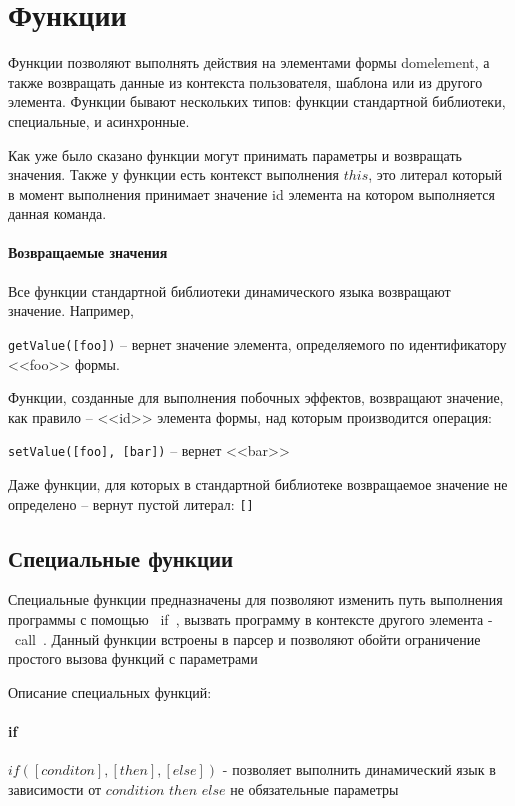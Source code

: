\documentclass[../index.tex]{subfiles}
\begin{document}
\label{sec:functions}
\section{Функции}

Функции позволяют выполнять действия на элементами формы \gls{domelement}, а также 
возвращать данные из контекста пользователя, шаблона или из другого элемента. 
Функции бывают нескольких типов: функции стандартной библиотеки, специальные, и асинхронные.

Как уже было сказано функции могут принимать параметры и возвращать значения. 
Также у функции есть контекст выполнения $this$, это литерал который в момент выполнения принимает значение id 
элемента на котором выполняется данная команда.

\paragraph{Возвращаемые значения}

Все функции стандартной библиотеки динамического языка возвращают значение. Например,

\verb|getValue([foo])| -- вернет значение элемента, определяемого по идентификатору <<foo>> формы.

Функции, созданные для выполнения побочных эффектов, возвращают значение, как правило -- <<id>> элемента формы, над которым производится операция:

\verb|setValue([foo], [bar])| -- вернет <<bar>>

Даже функции, для которых в стандартной библиотеке возвращаемое значение не определено -- вернут пустой литерал: \verb|[]|

\subsection{Специальные функции}
Специальные функции предназначены для позволяют изменить путь выполнения программы с помощью ~if~, 
вызвать программу в контексте другого элемента - ~call~.
Данный функции встроены в парсер и позволяют обойти ограничение простого вызова функций с параметрами

Описание специальных функций:

\label{p:if}
\paragraph{if}
$if([conditon], [then], [else])$ - позволяет выполнить динамический язык в зависимости от $condition$
$then$ $else$ не обязательные параметры
\end{document}
